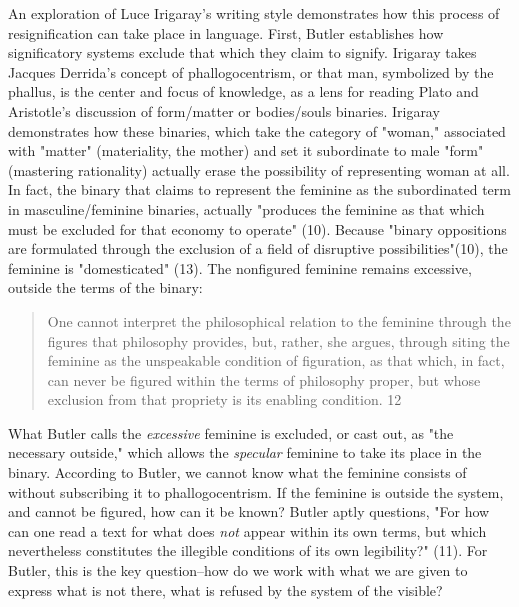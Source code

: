 \documentclass[11pt]{article}
\begin{document}
An exploration of Luce Irigaray's writing style demonstrates how this
process of resignification can take place in language. First, Butler
establishes how significatory systems exclude that which they claim to
signify. Irigaray takes Jacques Derrida's concept of phallogocentrism,
or that man, symbolized by the phallus, is the center and focus of
knowledge, as a lens for reading Plato and Aristotle's discussion of
form/matter or bodies/souls binaries. Irigaray demonstrates how these
binaries, which take the category of "woman," associated with "matter"
(materiality, the mother) and set it subordinate to male "form"
(mastering rationality) actually erase the possibility of representing
woman at all. In fact, the binary that claims to represent the
feminine as the subordinated term in masculine/feminine binaries,
actually "produces the feminine as that which must be excluded for
that economy to operate" (10). Because "binary oppositions are
formulated through the exclusion of a field of disruptive
possibilities"(10), the feminine is "domesticated" (13). The
nonfigured feminine remains excessive, outside the terms of the
binary:
\begin{quote}
One cannot interpret the philosophical relation to the feminine
through the figures that philosophy provides, but, rather, she argues,
through siting the feminine as the unspeakable condition of
figuration, as that which, in fact, can never be figured within the
terms of philosophy proper, but whose exclusion from that propriety is
its enabling condition. 12
\end{quote}
What Butler calls the \emph{excessive} feminine is excluded, or cast out,
as "the necessary outside," which allows the \emph{specular} feminine to
take its place in the binary. According to Butler, we cannot know what
the feminine consists of without subscribing it to
phallogocentrism. If the feminine is outside the system, and cannot be
figured, how can it be known? Butler aptly questions, "For how can one
read a text for what does \emph{not} appear within its own terms, but which
nevertheless constitutes the illegible conditions of its own
legibility?" (11). For Butler, this is the key question--how do we
work with what we are given to express what is not there, what is
refused by the system of the visible?
\end{document}
